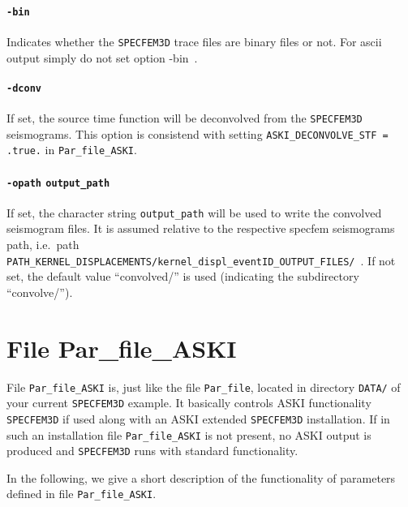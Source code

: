 \documentclass[12pt,a4paper]{article}
\newcommand{\lcode}[1]{\nolinkurl{#1}}
\newcommand{\lcodetitle}[1]{ {\ttfamily #1} }
\newcommand{\ASKI}{ {\ttfamily ASKI} }
\begin{document}
\paragraph{\lcode{-bin}}
Indicates whether the \lcode{SPECFEM3D} trace files are binary files or not. For ascii output simply 
do not set option -bin~.

\paragraph{\lcode{-dconv}}
If set, the source time function will be deconvolved from the \lcode{SPECFEM3D} seismograms. This option
is consistend with setting \lcode{ASKI_DECONVOLVE_STF = .true.} in \lcode{Par_file_ASKI}.

\paragraph{\lcode{-opath} \lcode{output_path}}
If set, the character string \lcode{output_path} will be used to write the convolved seismogram files. It is
assumed relative to the respective specfem seismograms path,
i.e.\ path \lcode{PATH_KERNEL_DISPLACEMENTS/kernel_displ_eventID_OUTPUT_FILES/}~. If not set, the default value
``convolved/'' is used (indicating the subdirectory ``convolve/'').

%
\section{File \lcodetitle{Par\_file\_ASKI}} \label{file_Par_file_ASKI}
%
File \lcode{Par_file_ASKI} is, just like the file \lcode{Par_file}, located in directory 
\lcode{DATA/} of your current \lcode{SPECFEM3D} example. It basically controls \ASKI{} functionality 
\lcode{SPECFEM3D} if used along with an \ASKI{} extended \lcode{SPECFEM3D} installation. If in such an 
installation file \lcode{Par_file_ASKI} is not present, no \ASKI{} output is produced and 
\lcode{SPECFEM3D} runs with standard functionality. 

In the following, we give a short description of the functionality of parameters defined
in file \lcode{Par_file_ASKI}.
\end{document}
